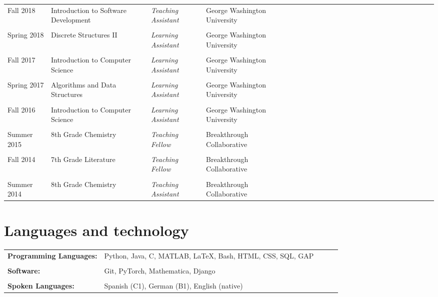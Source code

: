 \documentclass[a4paper,10pt]{article}
\begin{document}
{\def\next{\\\\[-0.2cm]}\fontsize{10}{12pt}\selectfont
\begin{tabular}{@{}lP{6.3cm}lP{8.3cm}r@{}}

Fall 2018 	      & 	Introduction to Software Development & \emph{Teaching Assistant } & George Washington University \next
Spring 2018 	    & 	Discrete Structures II & \emph{Learning Assistant} & George Washington University \next
Fall 2017	      	& 	Introduction to Computer Science &  \emph{Learning Assistant} & George Washington University \next
Spring 2017	 	    & 	Algorithms and Data Structures &  \emph{Learning Assistant}  & George Washington University\next
Fall 2016	 	      & 	Introduction to Computer Science &  \emph{Learning Assistant} & George Washington University \next
Summer 2015		    &	  8th Grade Chemistry	 	& \emph{Teaching Fellow} & Breakthrough Collaborative \next
Fall    2014      &	  7th Grade Literature	 	& \emph{Teaching Fellow} & Breakthrough Collaborative \next
Summer 2014       &   8th Grade Chemistry   & \emph{Teaching Assistant} & Breakthrough Collaborative

\end{tabular}}

\section{Languages and technology}
{\def\next{\\\\[-0.2cm]}\fontsize{10}{12pt}\selectfont
\begin{tabular}{@{}lP{18.3cm}lP{20.3cm}r@{}}
\textbf{Programming Languages:} & Python, Java, C, MATLAB, LaTeX, Bash, HTML, CSS, SQL, GAP \next
\textbf{Software:} & Git, PyTorch, Mathematica,  Django \next
\textbf{Spoken Languages:} & Spanish (C1), German (B1), English (native)
\end{tabular}}
\end{document}
